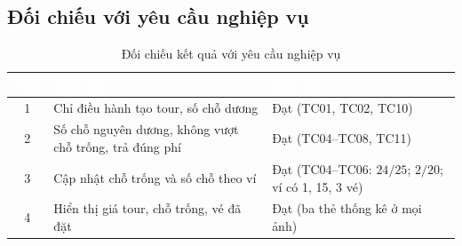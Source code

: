 \subsection{Đối chiếu với yêu cầu nghiệp vụ}

\begin{table}[H]
\centering
\caption{Đối chiếu kết quả với yêu cầu nghiệp vụ}
\begin{tabularx}{\linewidth}{|c|X|X|}
\hline
\rowcolor{navyblue}\textcolor{white}{\textbf{STT}} & \textcolor{white}{\textbf{Yêu cầu}} & \textcolor{white}{\textbf{Kết quả}} \\
\hline
1 & Chỉ điều hành tạo tour, số chỗ dương & Đạt (TC01, TC02, TC10) \\
\hline
\rowcolor{rowgray}
2 & Số chỗ nguyên dương, không vượt chỗ trống, trả đúng phí & Đạt (TC04--TC08, TC11) \\
\hline
3 & Cập nhật chỗ trống và số chỗ theo ví & Đạt (TC04--TC06: $24/25$; $2/20$; ví có 1, 15, 3 vé) \\
\hline
\rowcolor{rowgray}
4 & Hiển thị giá tour, chỗ trống, vé đã đặt & Đạt (ba thẻ thống kê ở mọi ảnh) \\
\hline
\end{tabularx}
\end{table}
